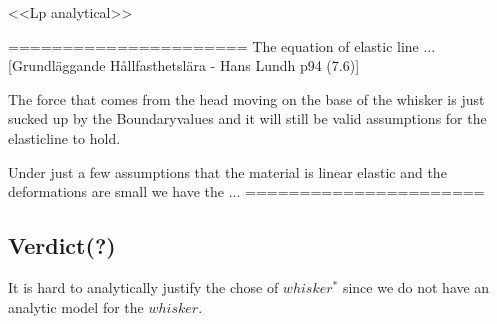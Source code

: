     <<Lp analytical>>


======================
The equation of elastic line ... [Grundläggande Hållfasthetslära - Hans Lundh
p94 (7.6)]

The force that comes from the head moving on the base of the whisker is just 
sucked up by the Boundaryvalues and it will still be valid assumptions for the
elasticline to hold.

Under just a few assumptions that the material is linear elastic and the
deformations are small we have the ...
======================


\subsection{Verdict(?)}
    It is hard to analytically justify the chose of $whisker^*$ since we do not
    have an analytic model for the $whisker$.




